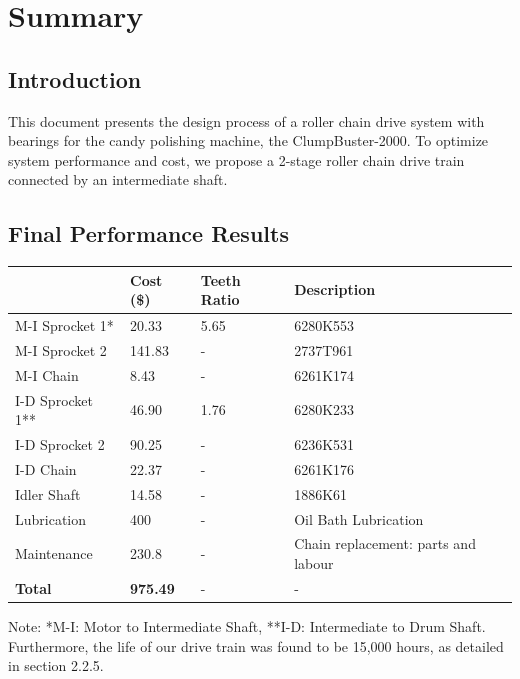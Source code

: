 \documentclass[letterpaper,12pt]{article}
\begin{document}
\section{Summary}
\subsection{Introduction}
This document presents the design process of a roller chain drive system with bearings for the candy polishing machine, the ClumpBuster-2000. To optimize system performance and cost, we propose a 2-stage roller chain drive train connected by an intermediate shaft.

\subsection{Final Performance Results}
\begin{center}
	\begin{tabular}{ |p{3cm}||p{2cm}|p{2cm}|p{7cm}|  }
		\hline
		 & Cost (\$) & Teeth Ratio & Description \\
		\hline
		M-I Sprocket 1* &20.33 & 5.65 & 6280K553 \\
		M-I Sprocket 2 &141.83 & - & 2737T961 \\
		M-I Chain & 8.43 & - & 6261K174 \\
		I-D Sprocket 1** & 46.90 & 1.76 & 6280K233 \\
		I-D Sprocket 2 & 90.25 & - & 6236K531 \\
		I-D Chain & 22.37 & - & 6261K176 \\
		Idler Shaft &14.58 & - & 1886K61\\
		\hline
		\hline
		Lubrication & 400&- & Oil Bath Lubrication\\
		\hline
		\hline
		Maintenance & 230.8& - & Chain replacement: parts and labour\\
		\hline
		\hline
		\textbf{Total} & \textbf{975.49}& - & - \\
		\hline
	\end{tabular}
\end{center}
\noindent Note: *M-I: Motor to Intermediate Shaft, **I-D: Intermediate to Drum Shaft. Furthermore, the life of our drive train was found to be 15,000 hours, as detailed in section 2.2.5.
\end{document}
